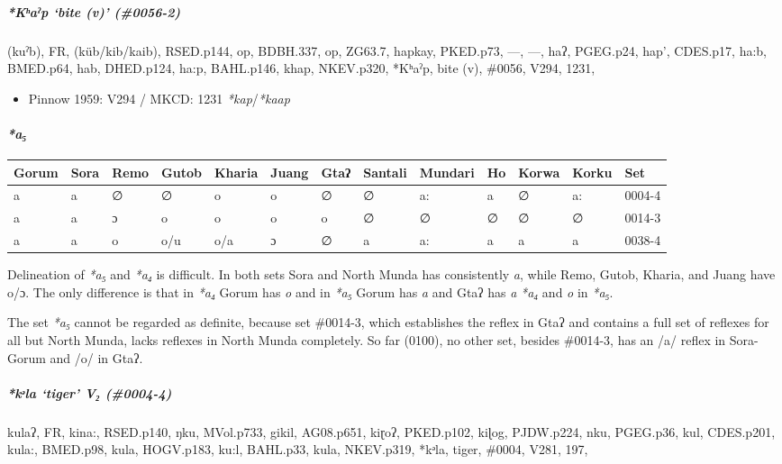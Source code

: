 \documentclass[a4paper,]{article}
\providecommand{\tightlist}{%
  \setlength{\itemsep}{0pt}\setlength{\parskip}{0pt}}
\let\oldparagraph\paragraph
\renewcommand{\paragraph}[1]{\oldparagraph{#1}\mbox{}}
\let\oldsubparagraph\subparagraph
\renewcommand{\subparagraph}[1]{\oldsubparagraph{#1}\mbox{}}
\begin{document}
\subparagraph{\texorpdfstring{\emph{*Kʰaˀp} `bite (v)'
(\#0056-2)}{*Kʰaˀp bite (v) (\#0056-2)}}\label{kux2b0aux2c0p-bite-v-0056-2}

(kuˀb), FR, (küb/kib/kaib), RSED.p144, op, BDBH.337, op, ZG63.7, hapkay,
PKED.p73, ---, ---, haʔ, PGEG.p24, hap', CDES.p17, ha:b, BMED.p64, hab,
DHED.p124, ha:p, BAHL.p146, khap, NKEV.p320, *Kʰaˀp, bite (v), \#0056,
V294, 1231,

\begin{itemize}
\tightlist
\item
  Pinnow 1959: V294 / MKCD: 1231 \emph{*kap}/\emph{*kaap}
\end{itemize}

\paragraph{\texorpdfstring{\emph{*a₅}}{*a₅}}\label{a-4}

\begin{longtable}[]{@{}lllllllllllll@{}}
\toprule
Gorum & Sora & Remo & Gutob & Kharia & Juang & Gtaʔ & Santali & Mundari
& Ho & Korwa & Korku & Set\tabularnewline
\midrule
\endhead
a & a & ∅ & ∅ & o & o & ∅ & ∅ & a: & a & ∅ & a: & 0004-4\tabularnewline
a & a & ɔ & o & o & o & o & ∅ & ∅ & ∅ & ∅ & ∅ & 0014-3\tabularnewline
a & a & o & o/u & o/a & ɔ & ∅ & a & a: & a & a & a &
0038-4\tabularnewline
\bottomrule
\end{longtable}

Delineation of \emph{*a₅} and \emph{*a₄} is difficult. In both sets Sora
and North Munda has consistently \emph{a}, while Remo, Gutob, Kharia,
and Juang have o/ɔ. The only difference is that in \emph{*a₄} Gorum has
\emph{o} and in \emph{*a₅} Gorum has \emph{a} and Gtaʔ has \emph{a}
\emph{*a₄} and \emph{o} in \emph{*a₅}.

The set \emph{*a₅} cannot be regarded as definite, because set \#0014-3,
which establishes the reflex in Gtaʔ and contains a full set of reflexes
for all but North Munda, lacks reflexes in North Munda completely. So
far (0100), no other set, besides \#0014-3, has an /a/ reflex in
Sora-Gorum and /o/ in Gtaʔ.

\subparagraph{\texorpdfstring{\emph{*kᵊla} `tiger' V₂
(\#0004-4)}{*kᵊla tiger V₂ (\#0004-4)}}\label{kux1d4ala-tiger-v-0004-4}

kulaʔ, FR, kina:, RSED.p140, ŋku, MVol.p733, gikil, AG08.p651, kiɽoʔ,
PKED.p102, kiɭog, PJDW.p224, nku, PGEG.p36, kul, CDES.p201, kula:,
BMED.p98, kula, HOGV.p183, ku:l, BAHL.p33, kula, NKEV.p319, *kᵊla,
tiger, \#0004, V281, 197,
\end{document}
